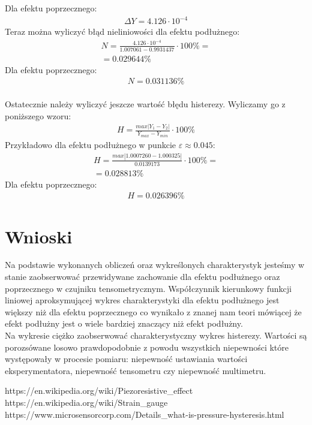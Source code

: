 \documentclass[11pt]{article}
\begin{document}
    Dla efektu poprzecznego:
    \begin{gather*}
        \Delta Y=4.126\cdot 10^{-4}
    \end{gather*}
    Teraz można wyliczyć błąd nieliniowości dla efektu podłużnego:
    \begin{gather*}
        N=\frac{4.126\cdot 10^{-4}}{1.007061-0.9931437}\cdot 100\% = \\
        = 0.029644 \%
    \end{gather*}
    Dla efektu poprzecznego:
    \begin{gather*}
        N=0.031136 \%
    \end{gather*}
    \\
    Ostatecznie należy wyliczyć jeszcze wartość błędu histerezy. Wyliczamy go z poniższego wzoru:
    \begin{gather*}
        H=\frac{max|Y_1-Y_2|}{Y_{max}-Y_{min}}\cdot 100\%
    \end{gather*}
    Przykładowo dla efektu podłużnego w punkcie $\varepsilon \approx 0.045$:
    \begin{gather*}
        H=\frac{max|1.0007260-1.000325|}{0.0139173}\cdot 100\%=\\
        = 0.028813 \%
    \end{gather*}
    Dla efektu poprzecznego:
    \begin{gather*}
        H=0.026396 \%
    \end{gather*}


    \section{Wnioski}
    \par Na podstawie wykonanych obliczeń oraz wykreślonych charakterystyk jesteśmy w stanie zaobserwować
    przewidywane zachowanie dla efektu podłużnego oraz poprzecznego w czujniku tensometrycznym. Współczynnik kierunkowy
    funkcji liniowej aproksymującej wykres charakterystyki dla efektu podłużnego jest większy niż dla efektu poprzecznego
    co wynikało z znanej nam teori mówiącej że efekt podłużny jest o wiele bardziej znaczący niż efekt podłużny.\\
    \indent Na wykresie ciężko zaobserwować charakterystyczny wykres histerezy. Wartości są porozsówane losowo prawdopodobnie z
    powodu wszystkich niepewności które występowały w procesie pomiaru: niepewność ustawiania wartości eksperymentatora, niepewność tensometru czy
    niepewność multimetru.



    \vfill
    \footnotesize
    \begin{thebibliography}{3}
        https://en.wikipedia.org/wiki/Piezoresistive\_effect
        https://en.wikipedia.org/wiki/Strain\_gauge
        https://www.microsensorcorp.com/Details\_what-is-pressure-hysteresis.html
    \end{thebibliography}
\end{document}
